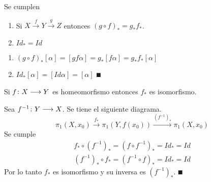 \documentclass[GTS.tex]{subfiles}
\begin{document}
\begin{prop} Se cumplen
\begin{enumerate}
\item Si $X\overset{f}{\longrightarrow}Y\overset{g}{\longrightarrow}Z$ entonces $(g\circ f)_*=g_*f_*$.
\item $Id_*=Id$
\end{enumerate}
\end{prop}
\begin{dem}
\begin{enumerate}
\item $(g\circ f)_*[\alpha]=[gf\alpha]=g_*[f\alpha]=g_*f_*[\alpha]$
\item $Id_*[\alpha]=[Id\alpha]=[\alpha]$
$\QED$
\end{enumerate}
\end{dem}

\begin{consec} Si $f\colon{X}\longrightarrow{Y}$ es homeomorfismo entonces $f_*$ es isomorfismo.
\begin{dem}
Sea $f^{-1}\colon{Y}\longrightarrow{X}$. Se tiene el siguiente diagrama.
\[
\pi_1(X,x_0)\overset{f_*}{\longrightarrow}\pi_1(Y,f(x_0))\overset{(f^{-1})_*}{\longrightarrow}\pi_1(X,x_0)
\]
Se cumple
\begin{gather*}
f_*\circ(f^{-1})_*=(f\circ f^{-1})_*=Id_*=Id\\
(f^{-1})_*\circ f_*=(f^{-1}\circ f)_*=Id_*=Id
\end{gather*}
Por lo tanto $f_*$ es isomorfismo y su inversa es $(f^{-1})_*$. $\QED$
\end{dem}
\end{consec}

\vspace{0.4cm}
\end{document}
